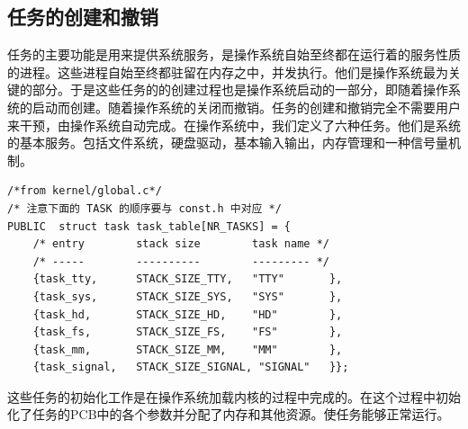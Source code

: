 \documentclass[UTF8,nofonts,cs4size]{ctexrep}
\begin{document}
\subsection{任务的创建和撤销}
任务的主要功能是用来提供系统服务，是操作系统自始至终都在运行着的服务性质的进程。这些进程自始至终都驻留在内存之中，并发执行。他们是操作系统最为关键的部分。于是这些任务的的创建过程也是操作系统启动的一部分，即随着操作系统的启动而创建。随着操作系统的关闭而撤销。任务的创建和撤销完全不需要用户来干预，由操作系统自动完成。在操作系统中，我们定义了六种任务。他们是系统的基本服务。包括文件系统，硬盘驱动，基本输入输出，内存管理和一种信号量机制。
\begin{lstlisting}
/*from kernel/global.c*/
/* 注意下面的 TASK 的顺序要与 const.h 中对应 */
PUBLIC	struct task	task_table[NR_TASKS] = {
	/* entry        stack size        task name */
	/* -----        ----------        --------- */
	{task_tty,      STACK_SIZE_TTY,   "TTY"       },
	{task_sys,      STACK_SIZE_SYS,   "SYS"       },
	{task_hd,       STACK_SIZE_HD,    "HD"        },
	{task_fs,       STACK_SIZE_FS,    "FS"        },
	{task_mm,       STACK_SIZE_MM,    "MM"        },
    {task_signal,	STACK_SIZE_SIGNAL, "SIGNAL"   }};
\end{lstlisting}
这些任务的初始化工作是在操作系统加载内核的过程中完成的。在这个过程中初始化了任务的PCB中的各个参数并分配了内存和其他资源。使任务能够正常运行。
\begin{lstlisting}
\end{lstlisting}
\end{document}
